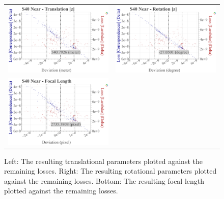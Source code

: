 \begin{figure}[!ht]
\begin{tabular}{cc}
    \includegraphics[width=0.45 \linewidth]{diagrams/calibration/s40_n_near/parameters.csv/Translation[z]_vs_Loss[Correspondences]_vs_Loss[Lambdas]_cluster_All.png} &
    \includegraphics[width=0.45 \linewidth]{diagrams/calibration/s40_n_near/parameters.csv/Rotation[z]_vs_Loss[Correspondences]_vs_Loss[Lambdas]_cluster_All.png} \\

    \includegraphics[width=0.45 \linewidth]{diagrams/calibration/s40_n_near/parameters.csv/FocalLength_vs_Loss[Correspondences]_vs_Loss[Lambdas]_cluster_All.png} &
\end{tabular}
\caption{
  Left: The resulting translational parameters plotted against the remaining losses. 
  Right: The resulting rotational parameters plotted against the remaining losses.
  Bottom: The resulting focal length  plotted against the remaining losses.
     }
\label{fig:static_calibration_algorithmic_error_s40_n_near}
\end{figure}

